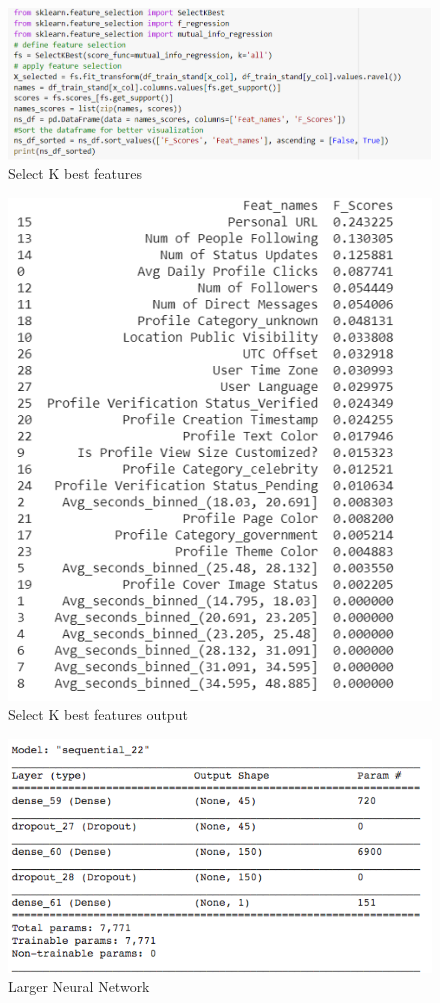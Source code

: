 \documentclass[sigplan,screen]{acmart}
\begin{document}
\begin{figure}[H]
\centering
\includegraphics[width=\columnwidth]{selectkbest.png}
\caption{Select K best features}\label{select_k_best}
\end{figure}
\begin{figure}[H]
\centering
\includegraphics[width=\columnwidth]{features.png}
\caption{Select K best features output}\label{select_k_best_output}
\end{figure}


\begin{figure}[H]
\centering
\includegraphics[width=\columnwidth, scale=0.6]{nn_structure.png}
\caption{Larger Neural Network}\label{neuralnetimage}
\end{figure}

\end{document}

